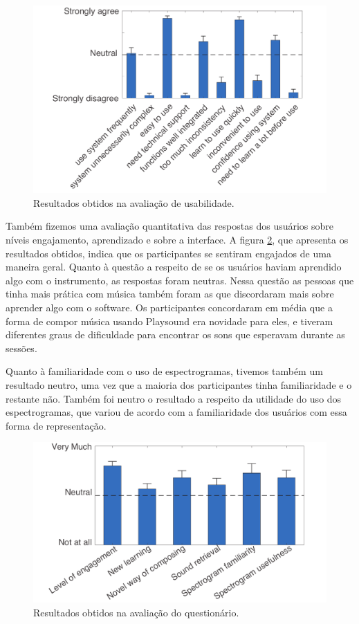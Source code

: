 \begin{figure}

\includegraphics[width=1\textwidth]{pictures/cap4/SUS_lower}
\caption{Resultados obtidos na avaliação de usabilidade.}
\label{fig:SUS}
\end{figure}

Também fizemos uma avaliação quantitativa das respostas dos usuários sobre níveis engajamento, aprendizado e sobre a interface. A figura \ref{fig:questionnaire}, que apresenta os resultados obtidos, indica que os participantes se sentiram engajados de uma maneira geral. Quanto à questão a respeito de se os usuários haviam aprendido algo com o instrumento, as respostas foram neutras. Nessa questão as pessoas que tinha mais prática com música também foram as que discordaram mais sobre aprender algo com o software. Os participantes concordaram em média que a forma de compor música usando Playsound era novidade para eles, e tiveram diferentes graus de dificuldade para encontrar os sons que esperavam durante as sessões. 

Quanto à familiaridade com o uso de espectrogramas, tivemos também um resultado neutro, uma vez que a maioria dos participantes tinha familiaridade e o restante não. Também foi neutro o resultado a respeito da utilidade do uso dos espectrogramas, que variou de acordo com a familiaridade dos usuários com essa forma de representação.


\begin{figure}

\includegraphics[width=1\textwidth]{pictures/cap4/questionnaire_lower}
\caption{\label{amas}Resultados obtidos na avaliação do questionário.}
\label{fig:questionnaire}
\end{figure}

